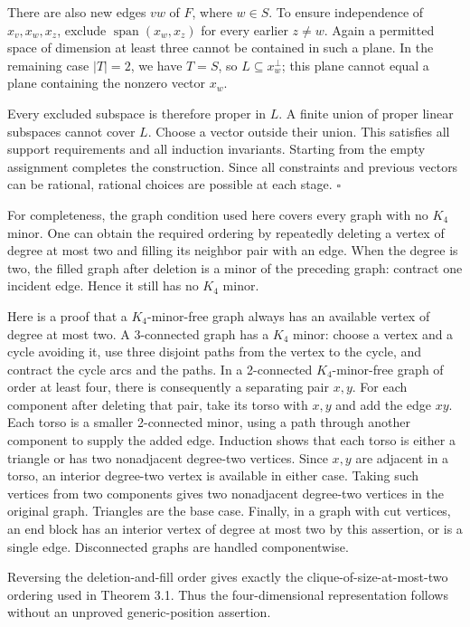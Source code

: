 \documentclass[
  10pt,
]{article}
\begin{document}
There are also new edges \(vw\) of \(F\), where \(w\in S\). To ensure
independence of \(x_v,x_w,x_z\), exclude
\(\operatorname{span}(x_w,x_z)\) for every earlier \(z\ne w\). Again a
permitted space of dimension at least three cannot be contained in such
a plane. In the remaining case \(|T|=2\), we have \(T=S\), so
\(L\subseteq x_w^\perp\); this plane cannot equal a plane containing the
nonzero vector \(x_w\).

Every excluded subspace is therefore proper in \(L\). A finite union of
proper linear subspaces cannot cover \(L\). Choose a vector outside
their union. This satisfies all support requirements and all induction
invariants. Starting from the empty assignment completes the
construction. Since all constraints and previous vectors can be
rational, rational choices are possible at each stage. \(\square\)

For completeness, the graph condition used here covers every graph with
no \(K_4\) minor. One can obtain the required ordering by repeatedly
deleting a vertex of degree at most two and filling its neighbor pair
with an edge. When the degree is two, the filled graph after deletion is
a minor of the preceding graph: contract one incident edge. Hence it
still has no \(K_4\) minor.

Here is a proof that a \(K_4\)-minor-free graph always has an available
vertex of degree at most two. A 3-connected graph has a \(K_4\) minor:
choose a vertex and a cycle avoiding it, use three disjoint paths from
the vertex to the cycle, and contract the cycle arcs and the paths. In a
2-connected \(K_4\)-minor-free graph of order at least four, there is
consequently a separating pair \(x,y\). For each component after
deleting that pair, take its torso with \(x,y\) and add the edge \(xy\).
Each torso is a smaller 2-connected minor, using a path through another
component to supply the added edge. Induction shows that each torso is
either a triangle or has two nonadjacent degree-two vertices. Since
\(x,y\) are adjacent in a torso, an interior degree-two vertex is
available in either case. Taking such vertices from two components gives
two nonadjacent degree-two vertices in the original graph. Triangles are
the base case. Finally, in a graph with cut vertices, an end block has
an interior vertex of degree at most two by this assertion, or is a
single edge. Disconnected graphs are handled componentwise.

Reversing the deletion-and-fill order gives exactly the
clique-of-size-at-most-two ordering used in Theorem 3.1. Thus the
four-dimensional representation follows without an unproved
generic-position assertion.
\end{document}
